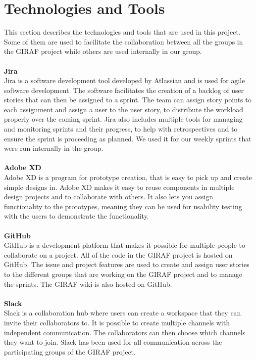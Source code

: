 \section{Technologies and Tools}\label{technologies-and-tools}
This section describes the technologies and tools that are used in this project. 
Some of them are used to facilitate the collaboration between all the groups in the GIRAF project while others are used internally in our group.
\\\\
\textbf{Jira}\\
Jira is a software development tool developed by Atlassian and is used for agile software development.
The software facilitates the creation of a backlog of user stories that can then be assigned to a sprint.
The team can assign story points to each assignment and assign a user to the user story, to distribute the workload properly over the coming sprint.
Jira also includes multiple tools for managing and monitoring sprints and their progress, to help with retrospectives and to ensure the sprint is proceeding as planned.
We used it for our weekly sprints that were run internally in the group.
\\\\
\textbf{Adobe XD}\\
Adobe XD is a program for prototype creation, that is easy to pick up and create simple designs in.
Adobe XD makes it easy to reuse components in multiple design projects and to collaborate with others.
It also lets you assign functionality to the prototypes, meaning they can be used for usability testing with the users to demonstrate the functionality.
\\\\
\textbf{GitHub}\\
GitHub is a development platform that makes it possible for multiple people to collaborate on a project. 
All of the code in the GIRAF project is hosted on GitHub.
The issue and project features are used to create and assign user stories to the different groups that are working on the GIRAF project and to manage the sprints. 
The GIRAF wiki is also hosted on GitHub.
\\\\
\textbf{Slack}\\
Slack is a collaboration hub where users can create a workspace that they can invite their collaborators to.
It is possible to create multiple channels with independent communication. 
The collaborators can then choose which channels they want to join.
Slack has been used for all communication across the participating groups of the GIRAF project.
